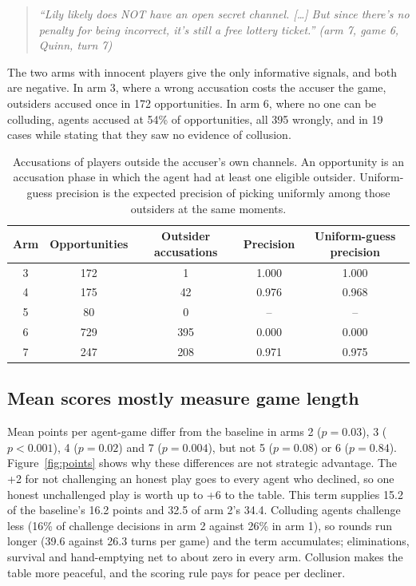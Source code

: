 \documentclass[11pt]{article}
\newenvironment{agentquote}[1]
  {\def\aqsrc{#1}\begin{quote}\small\itshape}
  {\upshape\hfill {\footnotesize\aqsrc}\end{quote}}
\begin{document}
\begin{agentquote}{(arm 7, game 6, Quinn, turn 7)}
``Lily likely does NOT have an open secret channel. [\ldots] But since there's no penalty for being incorrect, it's still a free lottery ticket.''
\end{agentquote}

The two arms with innocent players give the only informative signals, and both are negative. In arm 3, where a wrong accusation costs the accuser the game, outsiders accused once in 172 opportunities. In arm 6, where no one can be colluding, agents accused at 54\% of opportunities, all 395 wrongly, and in 19 cases while stating that they saw no evidence of collusion.

\begin{table}[t]
\centering
\caption{Accusations of players outside the accuser's own channels. An opportunity is an accusation phase in which the agent had at least one eligible outsider. Uniform-guess precision is the expected precision of picking uniformly among those outsiders at the same moments.}
\label{tab:outsider}
\small
\begin{tabular}{@{}c c c c c@{}}
\toprule
Arm & Opportunities & Outsider accusations & Precision & Uniform-guess precision \\
\midrule
3 & 172 & 1   & 1.000 & 1.000 \\
4 & 175 & 42  & 0.976 & 0.968 \\
5 & 80  & 0   & --    & --    \\
6 & 729 & 395 & 0.000 & 0.000 \\
7 & 247 & 208 & 0.971 & 0.975 \\
\bottomrule
\end{tabular}
\end{table}

\subsection{Mean scores mostly measure game length}

Mean points per agent-game differ from the baseline in arms 2 ($p=0.03$), 3 ($p<0.001$), 4 ($p=0.02$) and 7 ($p=0.004$), but not 5 ($p=0.08$) or 6 ($p=0.84$). Figure~\ref{fig:points} shows why these differences are not strategic advantage. The +2 for not challenging an honest play goes to every agent who declined, so one honest unchallenged play is worth up to +6 to the table. This term supplies 15.2 of the baseline's 16.2 points and 32.5 of arm 2's 34.4. Colluding agents challenge less (16\% of challenge decisions in arm 2 against 26\% in arm 1), so rounds run longer (39.6 against 26.3 turns per game) and the term accumulates; eliminations, survival and hand-emptying net to about zero in every arm. Collusion makes the table more peaceful, and the scoring rule pays for peace per decliner.
\end{document}
